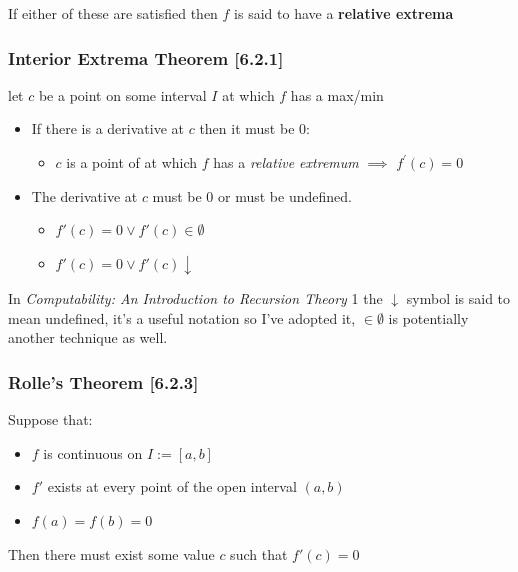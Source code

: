 \documentclass[class=article, crop=false]{standalone}
\begin{document}
If either of these are satisfied then \(f\) is said to have a
\textbf{relative extrema}

\hypertarget{header-n3999}{%
\subsubsection{Interior Extrema Theorem
{[}6.2.1{]}}\label{header-n3999}}

let \(c\) be a point on some interval \(I\) at which \(f\) has a max/min

\begin{itemize}
\item
  If there is a derivative at \(c\) then it must be 0:

  \begin{itemize}
  \item
    \(c\) is a point of at which \(f\) has a \emph{relative extremum}
    \(\implies\) \(f^{\prime}(c)=0\)
  \end{itemize}
\item
  The derivative at \(c\) must be 0 or must be undefined.

  \begin{itemize}
  \item
    \(f'(c) = 0 \vee f'(c) \in \emptyset\)
  \item
    \(f'(c) = 0 \vee f'(c) \downarrow\)
  \end{itemize}
\end{itemize}

In \emph{Computability: An Introduction to Recursion Theory} 1 the
\(\downarrow\) symbol is said to mean undefined, it's a useful notation
so I've adopted it, \(\in \emptyset\) is potentially another technique
as well.

\newpage
\hypertarget{header-n4017}{%
\subsubsection{Rolle's Theorem {[}6.2.3{]}}\label{header-n4017}}

Suppose that:

\begin{itemize}
\item
  \(f\) is continuous on \(I:= [a,b]\)
\item
  \(f'\) exists at every point of the open interval \((a,b)\)
\item
  \(f(a) = f(b) = 0\)
\end{itemize}

Then there must exist some value \(c\) such that \(f'(c) = 0\)
\end{document}
